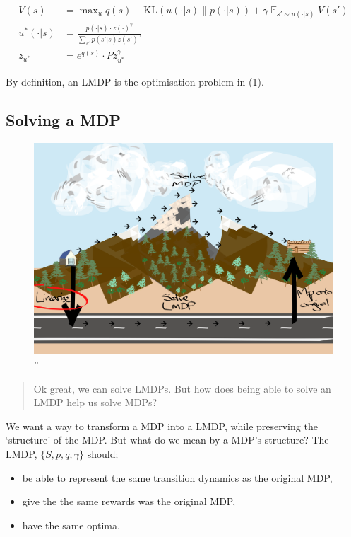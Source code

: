 \begin{align}
V(s) &= \mathop{\text{max}}_{u} q(s) - \text{KL}(u(\cdot| s) \parallel p(\cdot | s)) + \gamma \mathop{\mathbb E}_{s' \sim u(\cdot | s)} V(s') \tag{1}\\
u^{* }(\cdot | s) &= \frac{p(\cdot | s)\cdot z(\cdot)^{\gamma}}{\sum_{s'} p(s' | s) z(s')^{\gamma}} \tag{2}\\
z_{u^{* }} &= e^{q(s)}\cdot P z_{u^{* }}^{\gamma} \tag{3}
\end{align}

By definition, an LMDP is the optimisation problem in (1).

\subsection{Solving a MDP}

\begin{figure}
\centering
\includegraphics[width=1\textwidth,height=0.5\textheight]{../../pictures/drawings/abstract-representations-linear.png}
\caption{''}
\end{figure}

\begin{quote}
Ok great, we can solve LMDPs. But how does being able to solve an LMDP help us solve MDPs?
\end{quote}

We want a way to transform a MDP into a LMDP, while preserving the
`structure' of the MDP. But what do we mean by a MDP's structure?
The LMDP, \(\{S, p, q, \gamma\}\) should;

\begin{itemize}
\tightlist
\item
  be able to represent the same transition dynamics as the original MDP,
\item
  give the the same rewards was the original MDP,
\item
  have the same optima.
\end{itemize}

